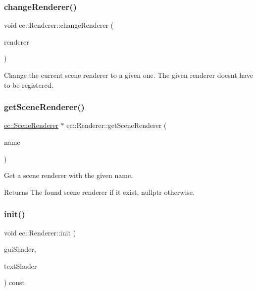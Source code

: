 \subsubsection{\texorpdfstring{change\+Renderer()}{changeRenderer()}\hspace{0.1cm}{\footnotesize\ttfamily [2/2]}}
{\footnotesize\ttfamily void ec\+::\+Renderer\+::change\+Renderer (\begin{DoxyParamCaption}\item[{\mbox{\hyperlink{classec_1_1_scene_renderer}{Scene\+Renderer}} $\ast$}]{renderer }\end{DoxyParamCaption})}



Change the current scene renderer to a given one. The given renderer doesn\textquotesingle{}t have to be registered. 

\mbox{\label{classec_1_1_renderer_ab4e0c57f9d1f061f97e1fa188d52c477}} 
\subsubsection{\texorpdfstring{get\+Scene\+Renderer()}{getSceneRenderer()}}
{\footnotesize\ttfamily \mbox{\hyperlink{classec_1_1_scene_renderer}{ec\+::\+Scene\+Renderer}} $\ast$ ec\+::\+Renderer\+::get\+Scene\+Renderer (\begin{DoxyParamCaption}\item[{const std\+::string \&}]{name }\end{DoxyParamCaption})}



Get a scene renderer with the given name. 

\begin{DoxyReturn}{Returns}
The found scene renderer if it exist, nullptr otherwise. 
\end{DoxyReturn}
\mbox{\label{classec_1_1_renderer_acfa2ed0fd23f3f6e36de59302a0148ad}} 
\subsubsection{\texorpdfstring{init()}{init()}}
{\footnotesize\ttfamily void ec\+::\+Renderer\+::init (\begin{DoxyParamCaption}\item[{\mbox{\hyperlink{classec_1_1_shader}{Shader}} $\ast$}]{gui\+Shader,  }\item[{\mbox{\hyperlink{classec_1_1_shader}{Shader}} $\ast$}]{text\+Shader }\end{DoxyParamCaption}) const}

